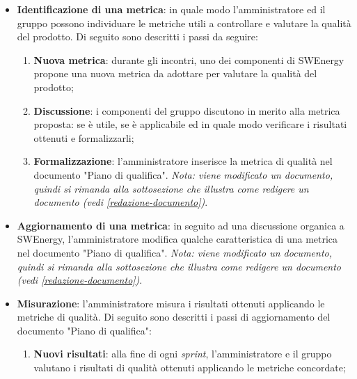 \begin{itemize}
	\item \textbf{Identificazione di una metrica}: in quale modo
	      l'amministratore ed il gruppo possono individuare le metriche utili a
	      controllare e valutare la qualità del prodotto. Di seguito sono
	      descritti i passi da seguire:
	      \begin{enumerate}
		      \item \textbf{Nuova metrica}: durante gli incontri, uno dei
		            componenti di SWEnergy propone una nuova metrica da adottare
		            per valutare la qualità del prodotto;

		      \item \textbf{Discussione}: i componenti del gruppo discutono in
		            merito alla metrica proposta: se è utile, se è applicabile
		            ed in quale modo verificare i risultati ottenuti e
		            formalizzarli;

		      \item \textbf{Formalizzazione}: l'amministratore inserisce la
		            metrica di qualità nel documento "Piano di qualifica".
		            \textit{Nota: viene modificato un documento, quindi si rimanda alla
			            sottosezione che illustra come redigere un documento
			            (vedi \cref{redazione-documento})}.
	      \end{enumerate}

	\item \textbf{Aggiornamento di una metrica}: in seguito ad una discussione
	      organica a SWEnergy, l'amministratore modifica qualche caratteristica
	      di una metrica nel documento "Piano di qualifica". \textit{Nota:
		      viene modificato un documento, quindi si rimanda alla
		      sottosezione che illustra come redigere un documento
		      (vedi \cref{redazione-documento})}.

	\item \textbf{Misurazione}: l'amministratore misura i risultati ottenuti
	      applicando le metriche di qualità. Di seguito sono descritti i passi
	      di aggiornamento del documento "Piano di qualifica":
	      \begin{enumerate}
		      \item \textbf{Nuovi risultati}: alla fine di ogni \textit{sprint},
		            l'amministratore e il gruppo valutano i risultati di qualità
		            ottenuti applicando le metriche concordate;


\end{enumerate}
\end{itemize}
